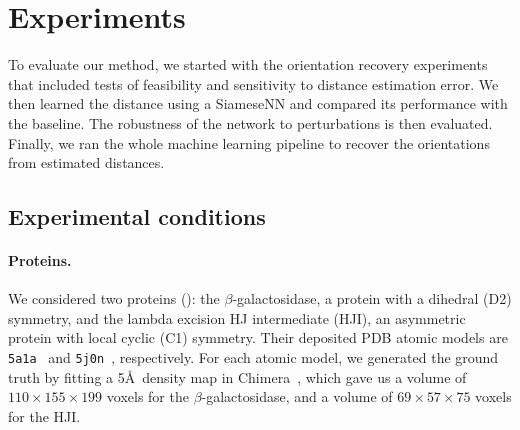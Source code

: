 \section{Experiments}\label{sec:experiments}



To evaluate our method, we started with the orientation recovery experiments that included tests of feasibility and sensitivity to distance estimation error.
We then learned the distance using a SiameseNN and compared its performance with the baseline.
The robustness of the network to perturbations is then evaluated.
Finally, we ran the whole machine learning pipeline to recover the orientations from estimated distances.

\subsection{Experimental conditions}\label{sec:results:data}

\paragraph{Proteins.}
We considered two proteins (): the $\beta$-galactosidase, a protein with a dihedral (D2) symmetry, and the lambda excision HJ intermediate (HJI), an asymmetric protein with local cyclic (C1) symmetry.
Their deposited PDB atomic models are \texttt{5a1a}~\cite{bartesaghi2015betagal} and \texttt{5j0n}~\cite{laxmikanthan2016structure}, respectively.
For each atomic model, we generated the ground truth by fitting a 5\AA\ density map in Chimera~\cite{pettersen2004ucsf}, which gave us a volume of $110 \times 155 \times 199$ voxels for the $\beta$-galactosidase, and a volume of $69 \times 57 \times 75$ voxels for the HJI.


